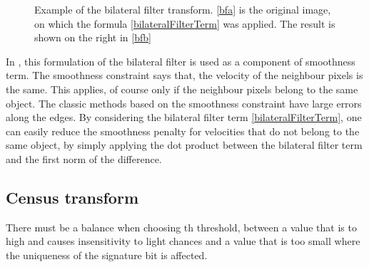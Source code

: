 \documentclass[12pt,a4paper,twoside]{report}
\begin{document}
\begin{figure} \label{BFexaple}
	\caption{Example of the bilateral filter transform. \ref{bfa} is the original image, on which the formula \ref{bilateralFilterTerm} was applied. The result is shown on the right in \ref{bfb}}
\end{figure}

In \cite{drulea2013}, this formulation of the bilateral filter is used as a component of smoothness term. The smoothness constraint says that, the velocity of the neighbour pixels is the same. This applies, of course only if the neighbour pixels belong to the same object. The classic methods based on the smoothness constraint have large errors along the edges. By considering the bilateral filter term \ref{bilateralFilterTerm}, one can easily reduce the smoothness penalty for velocities that do not belong to the same object, by simply applying the dot product between the bilateral filter term and the first norm of the difference. 

\subsection{Census transform}

There must be a balance when choosing th threshold, between a value that is to high and causes insensitivity to light chances and a value that is too small where the uniqueness of the signature bit is affected.
\end{document}
